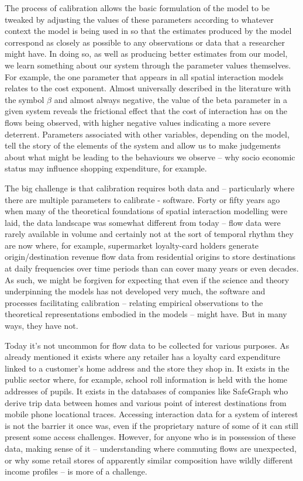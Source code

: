 \documentclass[11pt,letterpaper]{article}
\begin{document}
The process of calibration allows the basic formulation of the model to be tweaked by adjusting the values of these parameters according to whatever context the model is being used in so that the estimates produced by the model correspond as closely as possible to any observations or data that a researcher might have.
In doing so, as well as producing better estimates from our model, we learn something about our system through the parameter values themselves.
For example, the one parameter that appears in all spatial interaction models relates to the cost exponent.
Almost universally described in the literature with the symbol \(\beta\) and almost always negative, the value of the beta parameter in a given system reveals the frictional effect that the cost of interaction has on the flows being observed, with higher negative values indicating a more severe deterrent.
Parameters associated with other variables, depending on the model, tell the story of the elements of the system and allow us to make judgements about what might be leading to the behaviours we observe -- why socio economic status may influence shopping expenditure, for example.

The big challenge is that calibration requires both data and -- particularly where there are multiple parameters to calibrate - software.
Forty or fifty years ago when many of the theoretical foundations of spatial interaction modelling were laid, the data landscape was somewhat different from today -- flow data were rarely available in volume and certainly not at the sort of temporal rhythm they are now where, for example, supermarket loyalty-card holders generate origin/destination revenue flow data from residential origins to store destinations at daily frequencies over time periods than can cover many years or even decades.
As such, we might be forgiven for expecting that even if the science and theory underpinning the models has not developed very much, the software and processes facilitating calibration -- relating empirical observations to the theoretical representations embodied in the models -- might have.
But in many ways, they have not.

Today it's not uncommon for flow data to be collected for various purposes.
As already mentioned it exists where any retailer has a loyalty card expenditure linked to a customer's home address and the store they shop in.
It exists in the public sector where, for example, school roll information is held with the home addresses of pupils.
It exists in the databases of companies like SafeGraph who derive trip data between homes and various point of interest destinations from mobile phone locational traces.
Accessing interaction data for a system of interest is not the barrier it once was, even if the proprietary nature of some of it can still present some access challenges.
However, for anyone who is in possession of these data, making sense of it -- understanding where commuting flows are unexpected, or why some retail stores of apparently similar composition have wildly different income profiles -- is more of a challenge.
\end{document}
